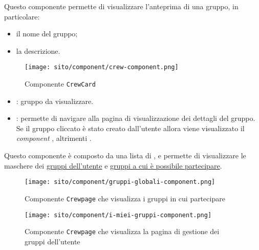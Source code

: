 \label{par:CrewCard}
Questo componente permette di visualizzare l'anteprima di una gruppo, in particolare:  
\begin{itemize}
    \item il nome del gruppo;
    \item la descrizione.
\end{itemize}

\begin{figure}[H] 
    \centering 
    \texttt{[image: sito/component/crew-component.png]} 
    \caption{Componente \texttt{CrewCard}}
\end{figure}

\begin{itemize}
    \item {}: gruppo da visualizzare.
\end{itemize}

\begin{itemize}
    \item {}: permette di navigare alla pagina di visualizzazione dei dettagli del gruppo. Se il gruppo cliccato è stato creato dall'utente allora viene visualizzato il \textit{component} , altrimenti .
\end{itemize}

\label{par:Crewpage}
Questo componente è composto da una lista di , e permette di visualizzare le maschere dei \hyperref[par:Gruppi dell'utente]{gruppi dell'utente} e \hyperref[par:Gruppi]{gruppi a cui è possibile partecipare}.

\begin{figure}[H] 
    \centering 
    \texttt{[image: sito/component/gruppi-globali-component.png]} 
    \caption{Componente \texttt{Crewpage} che visualizza i gruppi in cui partecipare}
\end{figure}

\begin{figure}[H] 
    \centering 
    \texttt{[image: sito/component/i-miei-gruppi-component.png]} 
    \caption{Componente \texttt{Crewpage} che visualizza la pagina di gestione dei gruppi dell'utente}
\end{figure}


